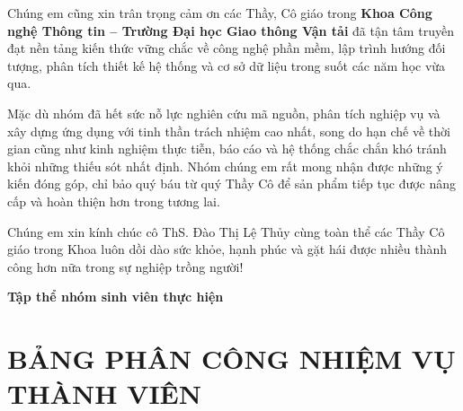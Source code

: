 Chúng em cũng xin trân trọng cảm ơn các Thầy, Cô giáo trong \textbf{Khoa Công nghệ Thông tin – Trường Đại học Giao thông Vận tải} đã tận tâm truyền đạt nền tảng kiến thức vững chắc về công nghệ phần mềm, lập trình hướng đối tượng, phân tích thiết kế hệ thống và cơ sở dữ liệu trong suốt các năm học vừa qua.

Mặc dù nhóm đã hết sức nỗ lực nghiên cứu mã nguồn, phân tích nghiệp vụ và xây dựng ứng dụng với tinh thần trách nhiệm cao nhất, song do hạn chế về thời gian cũng như kinh nghiệm thực tiễn, báo cáo và hệ thống chắc chắn khó tránh khỏi những thiếu sót nhất định. Nhóm chúng em rất mong nhận được những ý kiến đóng góp, chỉ bảo quý báu từ quý Thầy Cô để sản phẩm tiếp tục được nâng cấp và hoàn thiện hơn trong tương lai.

\vspace{5mm}
\noindent Chúng em xin kính chúc cô ThS. Đào Thị Lệ Thủy cùng toàn thể các Thầy Cô giáo trong Khoa luôn dồi dào sức khỏe, hạnh phúc và gặt hái được nhiều thành công hơn nữa trong sự nghiệp trồng người!

\vspace{15mm}
\begin{flushright}
    \textbf{Tập thể nhóm sinh viên thực hiện}
\end{flushright}

\cleardoublepage
\chapter*{BẢNG PHÂN CÔNG NHIỆM VỤ THÀNH VIÊN}

